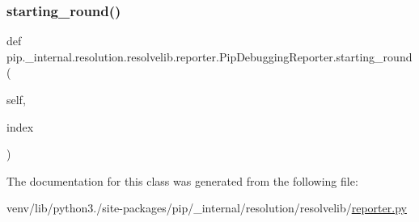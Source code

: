 \subsubsection{\texorpdfstring{starting\+\_\+round()}{starting\_round()}}
{\footnotesize\ttfamily def pip.\+\_\+internal.\+resolution.\+resolvelib.\+reporter.\+Pip\+Debugging\+Reporter.\+starting\+\_\+round (\begin{DoxyParamCaption}\item[{}]{self,  }\item[{}]{index }\end{DoxyParamCaption})}



The documentation for this class was generated from the following file\+:\begin{DoxyCompactItemize}
\item 
venv/lib/python3./site-\/packages/pip/\+\_\+internal/resolution/resolvelib/\hyperlink{reporter_8py}{reporter.\+py}\end{DoxyCompactItemize}
